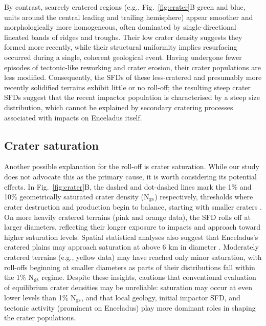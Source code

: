 \documentclass[preprint,11pt,3p,times,authoryear]{elsarticle}
\begin{document}
By contrast, scarcely cratered regions (e.g., Fig.~\ref{fig:crater}B green and blue, units around the central leading and trailing hemisphere) appear smoother and morphologically more homogeneous, often dominated by single-directional lineated bands of ridges and troughs. Their low crater density suggests they formed more recently, while their structural uniformity implies resurfacing occurred during a single, coherent geological event. Having undergone fewer episodes of tectonic-like reworking and crater erosion, their crater populations are less modified. 
Consequently, the SFDs of these less-cratered and presumably more recently solidified terrains exhibit little or no roll-off; the resulting steep crater SFDs suggest that the recent impactor population is characterised by a steep size distribution, which cannot be explained by secondary cratering processes associated with impacts on Enceladus itself.\normalcolor\\

\subsection{Crater saturation}
\label{subsec:saturation}
Another possible explanation for the roll-off is crater saturation. While our study does not advocate this as the primary cause, it is worth considering its potential effects. 
In Fig.~\ref{fig:crater}B, the dashed and dot-dashed lines mark the 1\% and 10\% geometrically saturated crater density (N$_{\rm gs}$) respectively, thresholds where crater destruction and production begin to balance, starting with smaller craters \citep{Gault1970}.
On more heavily cratered terrains (pink and orange data), the SFD rolls off at larger diameters, reflecting their longer exposure to impacts and approach toward higher saturation levels. Spatial statistical analyses also suggest that Enceladus’s cratered plains may approach saturation at above 6 km in diameter \citep{Kirchoff2018b}. Moderately cratered terrains (e.g., yellow data) may have reached only minor saturation, with roll-offs beginning at smaller diameters as parts of their distributions fall within the 1\% N$_{\rm gs}$ regime. Despite these insights, \citet{Xiao2015} cautions that conventional evaluation of equilibrium crater densities may be unreliable: saturation may occur at even lower levels than 1\% N$_{\rm gs}$, and that local geology, initial impactor SFD, and tectonic activity (prominent on Enceladus) play more dominant roles in shaping the crater populations.
\end{document}
